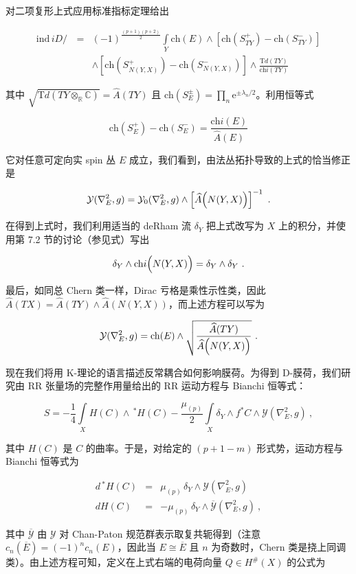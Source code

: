 \documentclass[11pt,a4paper]{ctexart}
\begin{document}
对二项复形上式应用标准指标定理给出

\[\begin{matrix}
\mathrm{ind}\,iD/\,&=&(-1)^{\frac{(p+1)(p+2)}{2}}\int\limits_Y\mathrm{ch}(E)\wedge
\left[\mathrm{ch}(S_{TY}^+)-\mathrm{ch}(S_{TY}^-)\right]\\
&& \wedge\left[\mathrm{ch}(S_{N(Y,X)}^+)-\mathrm{ch}(S_{N(Y,X)}^-)\right]
\wedge\frac{{\mathrm Td}(TY)}{\mathrm{ch}i(TY)}
\end{matrix}\]

其中 \(\sqrt{{\mathrm Td}(TY\otimes_{\mathbb{R}}{\mathbb{C}})}=\widehat{A}(TY)\) 且 \(\mathrm{ch}(S_E^\pm)=\prod_n\mbox{e}^{\pm\lambda_n/2}\)。利用恒等式

\[\mathrm{ch}(S_{E}^+)-\mathrm{ch}(S_{E}^-)=\frac{\mathrm{ch}i(E)}{\widehat{A}(E)}\]

它对任意可定向实 spin 丛 \(E\) 成立，我们看到，由法丛拓扑导致的上式的恰当修正是

\[{\mathcal Y}(\nabla_E^2,g)={\mathcal Y}_0(\nabla_E^2,g)\wedge
\left[\widehat{A}\Bigl(N(Y,X)\Bigr)\right]^{-1} \ .\]

在得到上式时，我们利用适当的 deRham 流 \(\delta_Y\) 把上式改写为 \(X\) 上的积分，并使用第 7.2 节的讨论（参见式）写出

\[\delta_Y\wedge\mathrm{ch}i\Bigl(N(Y,X)\Bigr)
=\delta_Y\wedge\delta_Y\ .\]

最后，如同总 Chern 类一样，Dirac 亏格是乘性示性类，因此 \(\widehat{A}(TX)=\widehat{A}(TY)\wedge\widehat{A}(N(Y,X))\)，而上述方程可以写为

\[{\mathcal Y}(\nabla^2_E,g)=\mathrm{ch}(E)\wedge\sqrt{\frac{\widehat{A}(TY)}
{\widehat{A}\Bigl(N(Y,X)\Bigr)}}\ .\]

现在我们将用 K-理论的语言描述反常耦合如何影响膜荷。为得到 D-膜荷，我们研究由 RR 张量场的完整作用量给出的 RR 运动方程与 Bianchi 恒等式：

\[S=-\frac{1}{4}\int\limits_{X}H(C)\wedge\,^*H(C)
-\frac{\mu_{(p)}}{2}\int\limits_X\delta_Y\wedge f^*C\wedge {\mathcal
Y}(\nabla_E^{2},g)\ ,\]

其中 \(H(C)\) 是 \(C\) 的曲率。于是，对给定的 \((p+1-m)\) 形式势，运动方程与 Bianchi 恒等式为

\[\begin{matrix}
d\,^*H(C)&=&\mu_{(p)}\,\delta_Y\wedge {\mathcal Y}(\nabla_E^{2},g)\\
dH(C)&=&-\mu_{(p)}\,\delta_Y\wedge \overline{{\mathcal Y}}(\nabla_E^{2},g)\ ,
\end{matrix}\]

其中 \(\overline{{\mathcal Y}}\) 由 \({\mathcal Y}\) 对 Chan-Paton 规范群表示取复共轭得到（注意 \(c_n(\overline{E})=(-1)^nc_n(E)\)，因此当 \(E\cong\overline{E}\) 且 \(n\) 为奇数时，Chern 类是挠上同调类）。由上述方程可知，定义在上式右端的电荷向量 \(Q\in H^\#(X)\) 的公式为
\end{document}
